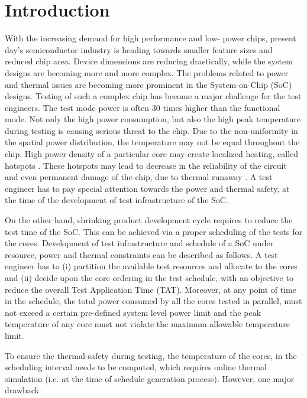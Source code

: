 \documentclass[conference]{IEEEtran}
\begin{document}
	\section{Introduction}
	With the increasing demand for high performance and low-
power chips, present day’s semiconductor industry is heading
towards smaller feature sizes and reduced chip area. Device
dimensions are reducing drastically, while the system designs
are becoming more and more complex. The problems related to
power and thermal issues are becoming more prominent in the
System-on-Chip (SoC) designs. Testing of such a complex chip
has become a major challenge for the test engineers. The test
mode power is often 30 times higher than the functional mode.
Not only the high power consumption, but also the high peak
temperature during testing is causing serious threat to the chip.
Due to the non-uniformity in the spatial power distribution,
the temperature may not be equal throughout the chip. High
power density of a particular core may create localized heating,
called hotspots \cite{cho2006peakaso:1}. These hotspots may lead to decrease in
the reliability of the circuit and even permanent damage of the
chip, due to thermal runaway \cite{girard2002survey}. A test engineer has to pay
special attention towards the power and thermal safety, at the
time of the development of test infrastructure of the SoC.\\
	\par
	On the other hand, shrinking product development cycle
requires to reduce the test time of the SoC. This can be
achieved via a proper scheduling of the tests for the cores.
Development of test infrastructure and schedule of a SoC under
resource, power and thermal constraints can be described as
follows. A test engineer has to (i) partition the available test
resources and allocate to the cores and (ii) decide upon the core
ordering in the test schedule, with an objective to reduce the
overall Test Application Time (TAT). Moreover, at any point
of time in the schedule, the total power consumed by all the
cores tested in parallel, must not exceed a certain pre-defined
system level power limit and the peak temperature of any core
must not violate the maximum allowable temperature limit.\\
	\par 
	To ensure the thermal-safety during testing, the temperature
of the cores, in the scheduling interval needs to be computed,
which requires online thermal simulation (i.e. at the time of
schedule generation process). However, one major drawback
\end{document}
